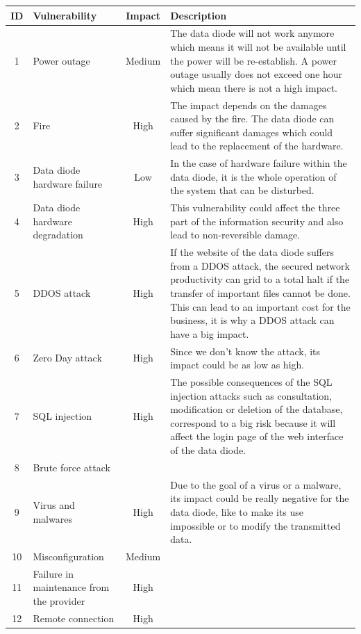 \documentclass[a4paper,10pt]{article}
\begin{document}
\begin{longtable}{|c|p{2.5cm}|c|p{10cm}|}
\hline
\textbf{ID}& \textbf{Vulnerability} &\textbf{Impact} & \textbf{Description}                 \\
\hline
1 & Power outage & Medium  &  The data diode will not work anymore which means it will not be available until the power will be re-establish. A power outage usually does not exceed one hour which mean there is not a high impact. \\
\hline
2 & Fire & High  &  The impact depends on the damages caused by the fire. The data diode can suffer significant damages which could lead to the replacement of the hardware.\\
\hline
3 & Data diode hardware failure  & Low & In the case of hardware failure within the data diode, it is the whole operation of the system that can be disturbed.\\
\hline
4 & Data diode hardware degradation & High & This vulnerability could affect the three part of the information security and also lead to non-reversible damage. \\
\hline
5 & DDOS attack & High & If the website of the data diode suffers from a DDOS attack, the secured network productivity can grid to a total halt if the transfer of important files cannot be done. This can lead to an important cost for the business, it is why a DDOS attack can have a big impact.\\
\hline
6 & Zero Day attack & High & Since we don't know the attack, its impact could be as low as high.\\
\hline
7 &  SQL injection & High & The possible consequences of the SQL injection attacks such as consultation, modification or deletion of the database, correspond to a big risk because it will affect the login page of the web interface of the data diode. \\
\hline
8 & Brute force attack & & \\
\hline
9 & Virus and malwares & High & Due to the goal of a virus or a malware, its impact could be really negative for the data diode, like to make its use impossible or to modify the transmitted data. \\
\hline
10 & Misconfiguration & Medium &  \\
\hline
11 & Failure in maintenance from the provider & High & \\
\hline
12 & Remote connection & High & \\
\hline

\end{longtable}
\end{document}
